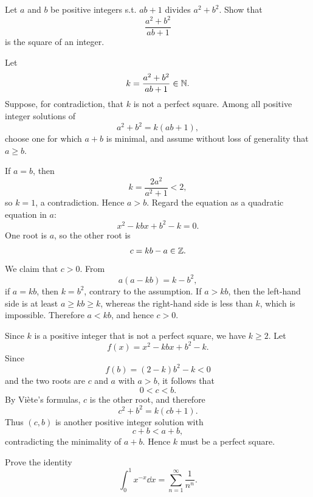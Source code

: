 
    \begin{expectedproblem}
        Let $a$ and $b$ be positive integers s.t. $ab+1$ divides
        $a^2+b^2$. Show that
        \[
            \frac{a^2+b^2}{ab+1}
        \]
        is the square of an integer.
    \end{expectedproblem}

    \begin{solution}
        Let
        \[
            k=\frac{a^2+b^2}{ab+1}\in\mathbb{N}.
        \]
        Suppose, for contradiction, that $k$ is not a perfect square. Among all
        positive integer solutions of
        \[
            a^2+b^2=k(ab+1),
        \]
        choose one for which $a+b$ is minimal, and assume without loss of
        generality that $a\geq b$.

        If $a=b$, then
        \[
            k=\frac{2a^2}{a^2+1}<2,
        \]
        so $k=1$, a contradiction. Hence $a>b$. Regard the equation as a
        quadratic equation in $a$:
        \[
            x^2-kbx+b^2-k=0.
        \]
        One root is $a$, so the other root is
        \[
            c=kb-a\in\mathbb{Z}.
        \]
        We claim that $c>0$. From
        \[
            a(a-kb)=k-b^2,
        \]
        if $a=kb$, then $k=b^2$, contrary to the assumption. If $a>kb$, then
        the left-hand side is at least $a\geq kb\geq k$, whereas the
        right-hand side is less than $k$, which is impossible. Therefore
        $a<kb$, and hence $c>0$.

        Since $k$ is a positive integer that is not a perfect square, we have
        $k\geq2$. Let
        \[
            f(x)=x^2-kbx+b^2-k.
        \]
        Since
        \[
            f(b)=(2-k)b^2-k<0
        \]
        and the two roots are $c$ and $a$ with $a>b$, it follows that
        \[
            0<c<b.
        \]
        By Vi\`ete's formulas, $c$ is the other root, and therefore
        \[
            c^2+b^2=k(cb+1).
        \]
        Thus $(c,b)$ is another positive integer solution with
        \[
            c+b<a+b,
        \]
        contradicting the minimality of $a+b$. Hence $k$ must be a perfect
        square.
    \end{solution}

    \begin{expectedproblem}
        Prove the identity
        \[
            \int_0^1 x^{-x}\dd x
            =
            \sum_{n=1}^{\infty}\frac{1}{n^n}.
        \]
    \end{expectedproblem}

